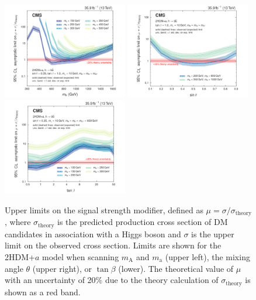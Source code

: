 \begin{figure}[htbp]
  \centering
  \includegraphics[width=0.485\textwidth]{figures/limits/limits_2hdma_mass.pdf}
  \includegraphics[width=0.485\textwidth]{figures/limits/limits_2hdma_sinp.pdf}\\
  \includegraphics[width=0.485\textwidth]{figures/limits/limits_2hdma_tanb.pdf}\\
  \caption{Upper limits on the signal strength modifier, defined as $\mu=\sigma/\sigma_\text{theory}$, where $\sigma_\text{theory}$ is the predicted production cross section of DM candidates in association with a Higgs boson and $\sigma$ is the upper limit on the observed cross section. Limits are shown for the 2HDM+$a$ model when scanning $m_\text{A}$ and $m_\text{a}$ (upper left), the mixing angle $\theta$ (upper right), or $\tan\beta$ (lower). The theoretical value of $\mu$ with an uncertainty of 20\% due to the theory calculation of $\sigma_\text{theory}$ is shown as a red band.}
  \label{fig:limits_2hdma}
\end{figure}


